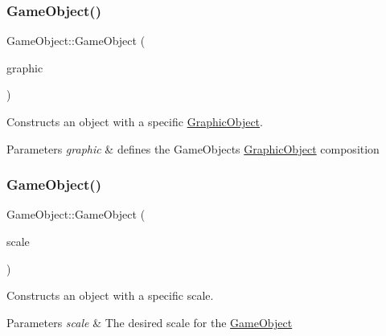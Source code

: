 \subsubsection{\texorpdfstring{Game\+Object()}{GameObject()}\hspace{0.1cm}{\footnotesize\ttfamily [1/3]}}
{\footnotesize\ttfamily Game\+Object\+::\+Game\+Object (\begin{DoxyParamCaption}\item[{const \hyperlink{class_graphic_object}{Graphic\+Object} \&}]{graphic }\end{DoxyParamCaption})}



Constructs an object with a specific \hyperlink{class_graphic_object}{Graphic\+Object}. 


\begin{DoxyParams}{Parameters}
{\em graphic} & defines the Game\+Objects \hyperlink{class_graphic_object}{Graphic\+Object} composition \\
\hline
\end{DoxyParams}
\mbox{\label{class_game_object_a93186927c126a290592e3d7c13906f18}} 
\subsubsection{\texorpdfstring{Game\+Object()}{GameObject()}\hspace{0.1cm}{\footnotesize\ttfamily [2/3]}}
{\footnotesize\ttfamily Game\+Object\+::\+Game\+Object (\begin{DoxyParamCaption}\item[{const \hyperlink{structxy_vector}{xy\+Vector} \&}]{scale }\end{DoxyParamCaption})}



Constructs an object with a specific scale. 


\begin{DoxyParams}{Parameters}
{\em scale} & The desired scale for the \hyperlink{class_game_object}{Game\+Object} \\
\hline
\end{DoxyParams}
\mbox{\label{class_game_object_a8a9022df605afb6be63d0dcca07667d6}} 

